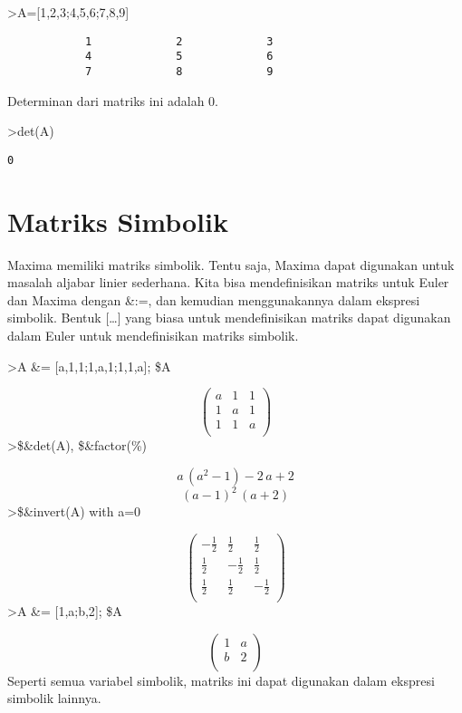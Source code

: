 \documentclass[
]{book}
\begin{document}
\textgreater A={[}1,2,3;4,5,6;7,8,9{]}

\begin{verbatim}
            1             2             3 
            4             5             6 
            7             8             9 
\end{verbatim}

Determinan dari matriks ini adalah 0.

\textgreater det(A)

\begin{verbatim}
0
\end{verbatim}

\chapter{Matriks Simbolik}\label{matriks-simbolik}

Maxima memiliki matriks simbolik. Tentu saja, Maxima dapat digunakan untuk masalah aljabar linier sederhana. Kita bisa mendefinisikan matriks untuk Euler dan Maxima dengan \&:=, dan kemudian menggunakannya dalam ekspresi simbolik. Bentuk {[}\ldots{]} yang biasa untuk mendefinisikan matriks dapat digunakan dalam Euler untuk mendefinisikan matriks simbolik.

\textgreater A \&= {[}a,1,1;1,a,1;1,1,a{]}; \$A

\[\begin{pmatrix}a & 1 & 1 \\ 1 & a & 1 \\ 1 & 1 & a \\ \end{pmatrix}\]\textgreater\$\&det(A), \$\&factor(\%)

\[a\,\left(a^2-1\right)-2\,a+2\]\[\left(a-1\right)^2\,\left(a+2\right)\]\textgreater\$\&invert(A) with a=0

\[\begin{pmatrix}-\frac{1}{2} & \frac{1}{2} & \frac{1}{2} \\ \frac{1
 }{2} & -\frac{1}{2} & \frac{1}{2} \\ \frac{1}{2} & \frac{1}{2} & -
 \frac{1}{2} \\ \end{pmatrix}\]\textgreater A \&= {[}1,a;b,2{]}; \$A

\[\begin{pmatrix}1 & a \\ b & 2 \\ \end{pmatrix}\]Seperti semua variabel simbolik, matriks ini dapat digunakan dalam ekspresi simbolik lainnya.
\end{document}
